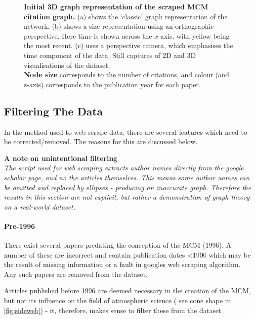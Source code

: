\begin{figure}[]
        \caption{ \textbf{Initial 3D graph representation of the scraped MCM citation graph.} (a) shows the `classic' graph representation of the network. (b) shows a size representation using an orthographic perspective. Here time is shown across the $x$ axis, with yellow being the most recent. (c)
        uses a perspective camera, which emphasises the time component of the data.
        Still captures of 2D and 3D visualisations of the dataset.\\
         \textbf{Node size} corresponds to the number of citations, and colour (and z-axis) corresponds to the publication year for each paper.}
        \label{fig:weball}

\end{figure}


\subsection{Filtering The Data}\label{sec:filter3d}


In the method used to web scrape data, there are several features which need to be corrected/removed. The reasons for this are discussed below.


\textbf{A note on unintentional filtering}\\
\textit{
The script used for web scraping extracts author names directly from the google scholar page, and no the articles themselves. This means some author names can be omitted and replaced by ellipses - producing an inaccurate graph. Therefore the results in this section are not explicit, but rather a demonstration of graph theory on a real-world dataset.
}


\paragraph*{Pre-1996}
There exist several papers predating the conception of the MCM (1996). A number of these are incorrect and contain publication dates <1900 which may be the result of missing information or a fault in googles web scraping algorithm. Any such papers are removed from the dataset.

Articles published before 1996 are deemed necessary in the creation of the MCM, but not its influence on the field of atmospheric science ( see cone shape in \autoref{fig:sideweb}) - it, therefore, makes sense to filter these from the dataset.


